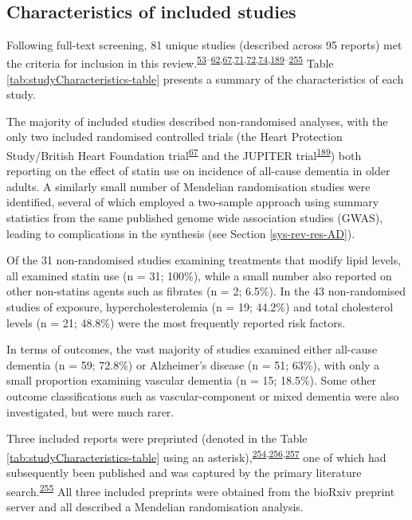 \documentclass[a4paper, twoside]{templates/ociamthesis}
\begin{document}
~

\hypertarget{sys-rev-characteristics}{%
\subsection{Characteristics of included studies}\label{sys-rev-characteristics}}

Following full-text screening, 81 unique studies (described across 95 reports) met the criteria for inclusion in this review.\textsuperscript{\protect\hyperlink{ref-kivipelto2005}{53}--\protect\hyperlink{ref-reitz2004}{62},\protect\hyperlink{ref-heartprotectionstudycollaborativegroup2002}{67},\protect\hyperlink{ref-larsson2017}{71},\protect\hyperlink{ref-ostergaard2015}{72},\protect\hyperlink{ref-benn2017}{74},\protect\hyperlink{ref-ridker2008}{189}--\protect\hyperlink{ref-zhu2018}{255}} Table \ref{tab:studyCharacteristics-table} presents a summary of the characteristics of each study.

The majority of included studies described non-randomised analyses, with the only two included randomised controlled trials (the Heart Protection Study/British Heart Foundation trial\textsuperscript{\protect\hyperlink{ref-heartprotectionstudycollaborativegroup2002}{67}} and the JUPITER trial\textsuperscript{\protect\hyperlink{ref-ridker2008}{189}}) both reporting on the effect of statin use on incidence of all-cause dementia in older adults. A similarly small number of Mendelian randomisation studies were identified, several of which employed a two-sample approach using summary statistics from the same published genome wide association studies (GWAS), leading to complications in the synthesis (see Section \ref{sys-rev-res-AD}).

Of the 31 non-randomised studies examining treatments that modify lipid levels, all examined statin use (n = 31; 100\%), while a small number also reported on other non-statins agents such as fibrates (n = 2; 6.5\%). In the 43 non-randomised studies of exposure, hypercholesterolemia (n = 19; 44.2\%) and total cholesterol levels (n = 21; 48.8\%) were the most frequently reported risk factors.

In terms of outcomes, the vast majority of studies examined either all-cause dementia (n = 59; 72.8\%) or Alzheimer's disease (n = 51; 63\%), with only a small proportion examining vascular dementia (n = 15; 18.5\%). Some other outcome classifications such as vascular-component or mixed dementia were also investigated, but were much rarer.

Three included reports were preprinted (denoted in the Table \ref{tab:studyCharacteristics-table} using an asterisk),\textsuperscript{\protect\hyperlink{ref-so2017}{254},\protect\hyperlink{ref-andrews2019}{256},\protect\hyperlink{ref-zhu2017}{257}} one of which had subsequently been published and was captured by the primary literature search.\textsuperscript{\protect\hyperlink{ref-zhu2018}{255}} All three included preprints were obtained from the bioRxiv preprint server and all described a Mendelian randomisation analysis.
\end{document}
